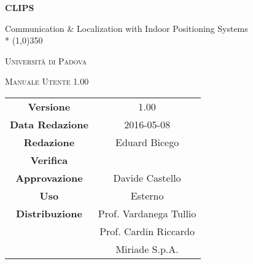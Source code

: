 \documentclass[a4paper,12pt]{article}
\author{Eduard Bicego}
\date{08/05/2016}
\begin{document}
\begin{titlepage}
	\centering
	{\huge\bfseries CLIPS\par}
	Communication \& Localization with Indoor Positioning Systems \\*
	\line(1,0){350} \\
	{\scshape\LARGE Università di Padova \par}
	\vspace{1cm}
	{\scshape\Large Manuale Utente 1.00 \par}
	\logo
	\newpage
	\begin{tabular}{c|c}
		{\hfill \textbf{Versione}} 			& 1.00						\\
		{\hfill\textbf{Data Redazione}} 	& 2016-05-08  				\\
		{\hfill\textbf{Redazione}} 			& Eduard Bicego				\\
		{\hfill\textbf{Verifica}} 			&  							\\
		{\hfill\textbf{Approvazione}} 		& Davide Castello			\\
		{\hfill\textbf{Uso}} 				& Esterno					\\
		{\hfill\textbf{Distribuzione}} 		& Prof. Vardanega Tullio	\\
											& Prof. Cardin Riccardo 	\\
											& Miriade S.p.A. 			\\
	\end{tabular}
\end{titlepage}
	
	\newpage
	\pagestyle{myfront}
	
		\newpage
			
		\newpage
			\tableofcontents
		\newpage
			\listoffigures
	\label{LastFrontPage}

	\newpage
		\pagestyle{mymain}
	\newpage
		
	\newpage
		
	\newpage
		
	\newpage
		
	\newpage
		

		
	\label{LastPage}
\end{document}

